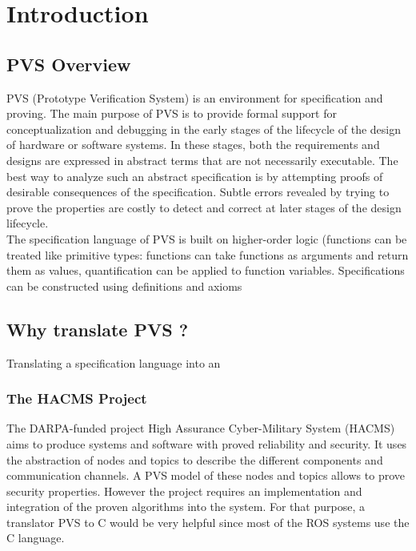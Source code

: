 \documentclass[12pt,a4paper]{article}
\begin{document}
\newpage
\tableofcontents
\newpage

\section{Introduction}


\subsection{PVS Overview}

PVS  (Prototype Verification System) is an environment for specification and proving. The main purpose of PVS is to provide formal support for conceptualization and debugging in the early stages of the lifecycle of the design of hardware or software systems. In these stages, both the requirements and designs are expressed in abstract terms that are not necessarily executable. The best way to analyze such an abstract specification is by attempting proofs of desirable consequences of the specification. Subtle errors revealed by trying to prove the properties are costly to detect and correct at later stages of the design lifecycle. \\

The specification language of PVS is built on higher-order logic (functions can be treated like primitive types: functions can take functions as arguments and return them as values, quantification can be applied to function variables. Specifications can be constructed using definitions and axioms





\subsection{Why translate PVS ?}

Translating a specification language into an 

\subsubsection*{The HACMS Project}

The DARPA-funded project High Assurance Cyber-Military System (HACMS) aims to produce systems and software with proved reliability and security. It uses the abstraction of nodes and topics to describe the different components and communication
channels. A PVS model of these nodes and topics allows to prove security properties. However the project requires an implementation and integration of the proven algorithms into the system. For that purpose, a translator PVS to C would be very helpful since most of the ROS systems use the C language.
\end{document}
